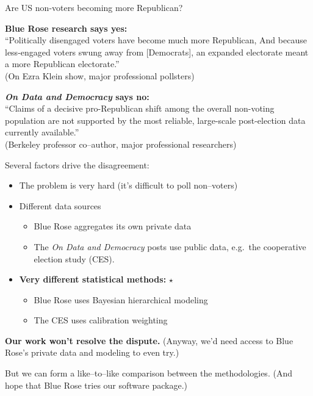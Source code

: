 
\begin{frame}{Are US non-voters becoming more Republican?}


\begin{minipage}{0.45\textwidth}
\centering
\textbf{Blue Rose research says yes:}
\\[1em]
``Politically disengaged voters have become much more Republican,
    And because less-engaged voters swung away from [Democrats], an expanded
    electorate meant a more Republican electorate.''
\\[1em]
\citep{blueroseresearch:2024} (On Ezra Klein show, major professional pollsters)
\end{minipage}
%
\hfill\vline\hfill
%
\begin{minipage}{0.45\textwidth}
\textbf{\emph{On Data and Democracy} says no:}
\\[1em]
\centering
``Claims of a decisive pro-Republican shift among the overall non-voting population are
  not supported by the most reliable, large-scale post-election data currently available.''
\\[1em]
\citep{datademocracyblog:2025} (Berkeley professor co--author, major professional researchers)
\end{minipage}

\vspace{1em}

Several factors drive the disagreement:
%
\begin{itemize}
\item The problem is very hard (it's difficult to poll non--voters)
\item Different data sources
%
\begin{itemize}
    \item Blue Rose aggregates its own private data
    \item The \emph{On Data and Democracy} posts use public data, e.g.~the
        cooperative election study (CES).
\end{itemize}
%
\item \textbf{Very different statistical methods:} $\star$
\begin{itemize}
    \item Blue Rose uses Bayesian hierarchical modeling
    \item The CES uses calibration weighting
\end{itemize}
%
\end{itemize}
%
\textbf{Our work won't resolve the dispute.}  (Anyway, we'd need access to Blue Rose's private
data and modeling to even try.)

But we can form a like--to--like comparison between the methodologies.  (And hope that
Blue Rose tries our software package.)

\end{frame}




